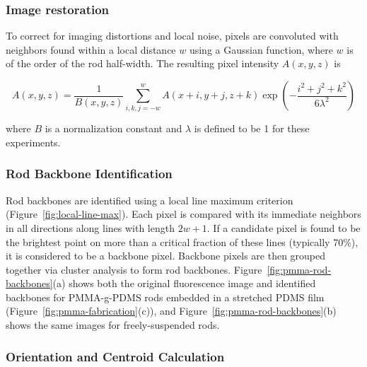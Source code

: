 \subsubsection{Image restoration}

To correct for imaging distortions and local noise, pixels are convoluted with neighbors found within a local
distance $w$ using a Gaussian function, where $w$ is of the order of the rod half-width. The resulting
pixel intensity $A(x,y,z)$ is

\begin{center}
\begin{equation}
A(x,y,z) = \frac{1}{B(x,y,z)} \sum_{i,k,j=-w}^w A(x+i,y+j,z+k) 
\exp{ \left( -\frac{i^2+j^2+k^2}{6\lambda^2} \right)}
\end{equation}
\end{center}

where $B$ is a normalization constant and $\lambda$ is defined to be 1 for these experiments.

\subsubsection{Rod Backbone Identification}


Rod backbones are identified using a local line maximum criterion (Figure~\ref{fig:local-line-max}).  
Each pixel is compared with its immediate 
neighbors in all directions along lines with length $2w+1$.  If a candidate pixel is found to be the brightest
point on more than a critical fraction of these lines (typically 70\%), it is considered to be a backbone
pixel.  Backbone pixels are then grouped together via cluster analysis to form rod backbones.  
Figure~\ref{fig:pmma-rod-backbones}(a)
shows both the original fluorescence image and identified backbones for PMMA-g-PDMS rods
embedded in a stretched PDMS film (Figure~\ref{fig:pmma-fabrication}(c)), and 
Figure~\ref{fig:pmma-rod-backbones}(b) shows the same images for freely-suspended rods.


\subsubsection{Orientation and Centroid Calculation}
\label{sec:orient-calculate}

